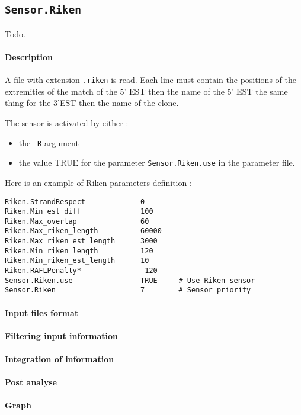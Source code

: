 
\subsection{\texttt{Sensor.Riken}}

Todo.

\paragraph{Description}

A file with extension \texttt{.riken} is read.  Each line must contain
the positions of the extremities of the match of the 5' EST then the
name of the 5' EST the same thing for the 3'EST then the name of the
clone.

The sensor is activated by either :
\begin{itemize}
\item the \texttt{-R} argument 
\item the value TRUE for the parameter \texttt{Sensor.Riken.use} in the
  parameter file.
\end{itemize}
Here is an example of Riken parameters definition :
\begin{Verbatim}[fontsize=\small]
Riken.StrandRespect             0
Riken.Min_est_diff              100
Riken.Max_overlap               60
Riken.Max_riken_length          60000
Riken.Max_riken_est_length      3000
Riken.Min_riken_length          120 
Riken.Min_riken_est_length      10
Riken.RAFLPenalty*              -120
Sensor.Riken.use                TRUE     # Use Riken sensor
Sensor.Riken                    7        # Sensor priority
\end{Verbatim}

\paragraph{Input files format}


\paragraph{Filtering input information}


\paragraph{Integration of information}


\paragraph{Post analyse}


\paragraph{Graph}






